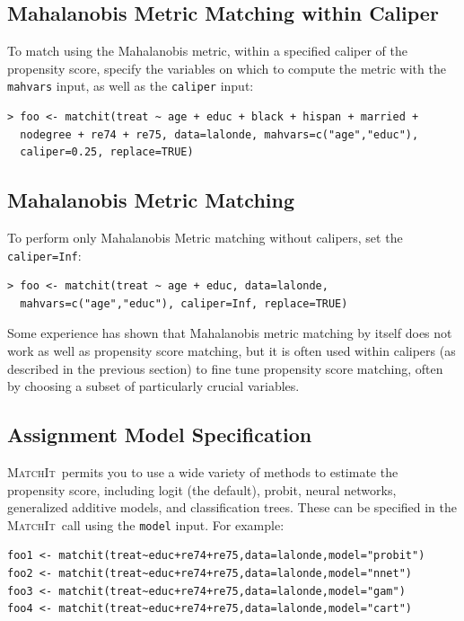 \documentclass[oneside,letterpaper,titlepage]{article}
\newcommand{\MatchIt}{\textsc{MatchIt}}
\begin{document}
\subsection{Mahalanobis Metric Matching within Caliper}
\label{mahal}
To match using the Mahalanobis metric, within a specified caliper of
the propensity score, specify the variables on which to compute the
metric with the \texttt{mahvars} input, as well as the
\texttt{caliper} input:

\begin{verbatim}
> foo <- matchit(treat ~ age + educ + black + hispan + married +
  nodegree + re74 + re75, data=lalonde, mahvars=c("age","educ"),
  caliper=0.25, replace=TRUE)
\end{verbatim}

\subsection{Mahalanobis Metric Matching}

To perform only Mahalanobis Metric matching without calipers, set the
\texttt{caliper=Inf}:

\begin{verbatim}
> foo <- matchit(treat ~ age + educ, data=lalonde,
  mahvars=c("age","educ"), caliper=Inf, replace=TRUE)
\end{verbatim}
Some experience has shown that Mahalanobis metric matching by itself
does not work as well as propensity score matching, but it is often
used within calipers (as described in the previous section) to fine
tune propensity score matching, often by choosing a subset of
particularly crucial variables.

\subsection{Assignment Model Specification}

\MatchIt\ permits you to use a wide variety of methods to estimate the
propensity score, including logit (the default), probit, neural
networks, generalized additive models, and classification trees.
These can be specified in the \MatchIt\ call using the \texttt{model}
input.  For example:

\begin{verbatim}
foo1 <- matchit(treat~educ+re74+re75,data=lalonde,model="probit")
foo2 <- matchit(treat~educ+re74+re75,data=lalonde,model="nnet")
foo3 <- matchit(treat~educ+re74+re75,data=lalonde,model="gam")
foo4 <- matchit(treat~educ+re74+re75,data=lalonde,model="cart")
\end{verbatim}
\end{document}
